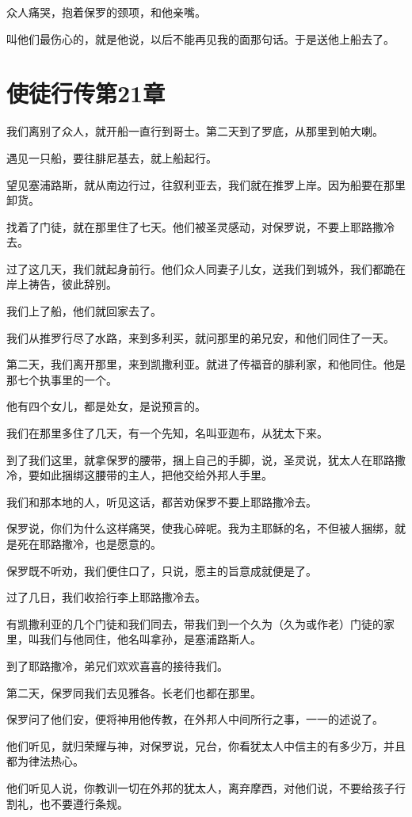 \documentclass[12pt,oneside]{book}
\begin{document}
众人痛哭，抱着保罗的颈项，和他亲嘴。

叫他们最伤心的，就是他说，以后不能再见我的面那句话。于是送他上船去了。

\chapter{使徒行传第21章}
我们离别了众人，就开船一直行到哥士。第二天到了罗底，从那里到帕大喇。

遇见一只船，要往腓尼基去，就上船起行。

望见塞浦路斯，就从南边行过，往叙利亚去，我们就在推罗上岸。因为船要在那里卸货。

找着了门徒，就在那里住了七天。他们被圣灵感动，对保罗说，不要上耶路撒冷去。

过了这几天，我们就起身前行。他们众人同妻子儿女，送我们到城外，我们都跪在岸上祷告，彼此辞别。

我们上了船，他们就回家去了。

我们从推罗行尽了水路，来到多利买，就问那里的弟兄安，和他们同住了一天。

第二天，我们离开那里，来到凯撒利亚。就进了传福音的腓利家，和他同住。他是那七个执事里的一个。

他有四个女儿，都是处女，是说预言的。

我们在那里多住了几天，有一个先知，名叫亚迦布，从犹太下来。

到了我们这里，就拿保罗的腰带，捆上自己的手脚，说，圣灵说，犹太人在耶路撒冷，要如此捆绑这腰带的主人，把他交给外邦人手里。

我们和那本地的人，听见这话，都苦劝保罗不要上耶路撒冷去。

保罗说，你们为什么这样痛哭，使我心碎呢。我为主耶稣的名，不但被人捆绑，就是死在耶路撒冷，也是愿意的。

保罗既不听劝，我们便住口了，只说，愿主的旨意成就便是了。

过了几日，我们收拾行李上耶路撒冷去。

有凯撒利亚的几个门徒和我们同去，带我们到一个久为（久为或作老）门徒的家里，叫我们与他同住，他名叫拿孙，是塞浦路斯人。

到了耶路撒冷，弟兄们欢欢喜喜的接待我们。

第二天，保罗同我们去见雅各。长老们也都在那里。

保罗问了他们安，便将神用他传教，在外邦人中间所行之事，一一的述说了。

他们听见，就归荣耀与神，对保罗说，兄台，你看犹太人中信主的有多少万，并且都为律法热心。

他们听见人说，你教训一切在外邦的犹太人，离弃摩西，对他们说，不要给孩子行割礼，也不要遵行条规。
\end{document}
